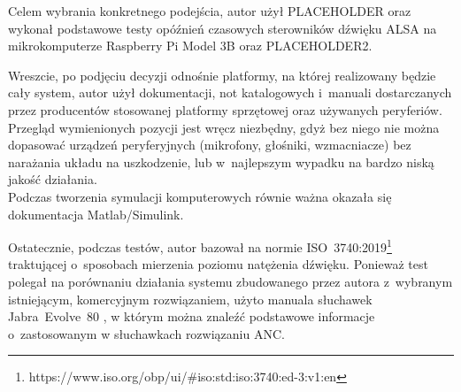 Celem wybrania konkretnego podejścia, autor użył PLACEHOLDER %
oraz wykonał podstawowe testy opóźnień czasowych sterowników dźwięku ALSA na mikrokomputerze Raspberry Pi Model 3B oraz PLACEHOLDER2.%

Wreszcie, po podjęciu decyzji odnośnie platformy, na której realizowany będzie cały system, autor użył dokumentacji, not katalogowych i~manuali dostarczanych przez producentów stosowanej platformy sprzętowej oraz używanych peryferiów. Przegląd wymienionych pozycji jest wręcz niezbędny, gdyż bez niego nie można dopasować urządzeń peryferyjnych (mikrofony, głośniki, wzmacniacze) bez narażania układu na uszkodzenie, lub w~najlepszym wypadku na bardzo niską jakość działania.\\
Podczas tworzenia symulacji komputerowych równie ważna okazała się dokumentacja Matlab/Simulink. 

Ostatecznie, podczas testów, autor bazował na normie ISO~3740:2019\footnote{https://www.iso.org/obp/ui/\#iso:std:iso:3740:ed-3:v1:en} traktującej o~sposobach mierzenia poziomu natężenia dźwięku. Ponieważ test polegał na porównaniu działania systemu zbudowanego przez autora z~wybranym istniejącym, komercyjnym rozwiązaniem, użyto manuala słuchawek Jabra~Evolve~80 \cite{JabraEvolve80}, w którym można znaleźć podstawowe informacje o~zastosowanym w słuchawkach rozwiązaniu ANC.